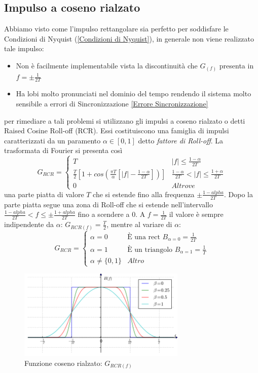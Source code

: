     \subsection{Impulso a coseno rialzato}
        Abbiamo visto come l'impulso rettangolare sia perfetto per soddisfare le Condizioni di Nyquist (\ref*{Condizioni di Nyquist}),
        in generale non viene realizzato tale impulso:
        \begin{itemize}
            \item {Non è facilmente implementabile vista la discontinuità che $G_{(f)}$ presenta in $f=\pm \frac{1}{2T}$}
            \item {Ha lobi molto pronunciati nel dominio del tempo rendendo il sistema molto sensibile a errori di Sincronizzazione \ref{Errore Sincronizzazione}}
        \end{itemize}
        per rimediare a tali problemi si utilizzano gli impulsi a coseno rialzato o detti Raised Cosine Roll-off (RCR). Essi 
        costituiscono una famiglia di impulsi caratterizzati da un paramento $\alpha\in [0,1]$ detto \emph{fattore di Roll-off}.
        La trasformata di Fourier si presenta così 
        \[
            G_{RCR} = 
            \begin{cases}
                T &|f| \leq \frac{1-\alpha}{2T}\nonumber \\
                \frac{T}{2} \left[1+cos\left(\frac{\pi T}{\alpha}\left[|f| - \frac{1-\alpha}{2T}\right]\right)\right] &\frac{1-\alpha}{2T}<|f|\leq \frac{1+\alpha}{2T}\nonumber \\
                0 &Altrove\nonumber
            \end{cases}    
        \]
        una parte piatta di valore $T$ che si estende fino alla frequenza $\pm \frac{1-alpha}{2T}$. Dopo la parte piatta
        segue una zona di Roll-off che si estende nell'intervallo $\frac{1-alpha}{2T}< f \leq \pm \frac{1+alpha}{2T}$ fino a scendere 
        a $0$. A $f=\frac{1}{2T}$ il valore è sempre indipendente da $\alpha$: $G_{RCR(f)} = \frac{T}{2}$, mentre al variare di $\alpha$:
        \[
            G_{RCR} = 
            \begin{cases}
                \alpha = 0 &\text{È una rect } B_{\alpha=0}=\frac{1}{2T} \nonumber\\
                \alpha=1 &\text{È un triangolo } B_{\alpha=1}=\frac{1}{T}\nonumber\\
                \alpha\neq \{0,1\} & Altro\nonumber
            \end{cases}
        \]
        \begin{figure}[H]
            \centering
            \includegraphics[width = 8cm]{media/Hf-Raised-cosine_filter.png}
            \caption{Funzione coseno rialzato: $G_{RCR(f)}$}
        \end{figure}
